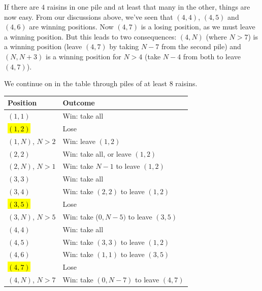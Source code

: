 \documentclass[12pt,letterpaper]{article}
\begin{document}
\begin{enumerate}
  If there are $4$ raisins in one pile and at least that many in the
  other, things are now easy.  From our discussions above, we've seen
  that $(4,4)$, $(4,5)$ and $(4,6)$ are winning positions.  Now
  $(4,7)$ is a losing position, as we must leave a winning position.
  But this leads to two consequences: $(4,N)$
  (where $N>7$) is a winning position (leave $(4,7)$ by taking $N-7$
  from the second pile) and $(N,N+3)$ is a winning position for $N>4$
  (take $N-4$ from both to leave $(4,7)$).

  We continue on in the table through piles of at least $8$
  raisins. 

  \begin{table}[htbp]
    \centering
    \begin{tabular}{ll}
      Position & Outcome \\ \toprule
      $(1,1)$ & Win: take all \\
      \hl{$(1,2)$} & Lose \\
      $(1,N)$, $N>2$ & Win: leave $(1,2)$ \\ \midrule
      $(2,2)$ & Win: take all, or leave $(1,2)$ \\
      $(2,N)$, $N>1$ & Win: take $N-1$ to leave $(1,2)$ \\\midrule
      $(3,3)$ & Win: take all \\
      $(3,4)$ & Win: take $(2,2)$ to leave $(1,2)$ \\
      \hl{$(3,5)$} & Lose \\
      $(3,N)$, $N>5$ & Win: take ($0,N-5)$ to leave $(3,5)$ \\\midrule
      $(4,4)$ & Win: take all \\
      $(4,5)$ & Win: take $(3,3)$ to leave $(1,2)$ \\
      $(4,6)$ & Win: take $(1,1)$ to leave $(3,5)$ \\
      \hl{$(4,7)$} & Lose \\
      $(4,N)$, $N>7$ & Win: take $(0,N-7)$ to leave $(4,7)$\\\midrule

\end{tabular}
\end{table}
\end{enumerate}
\end{document}
